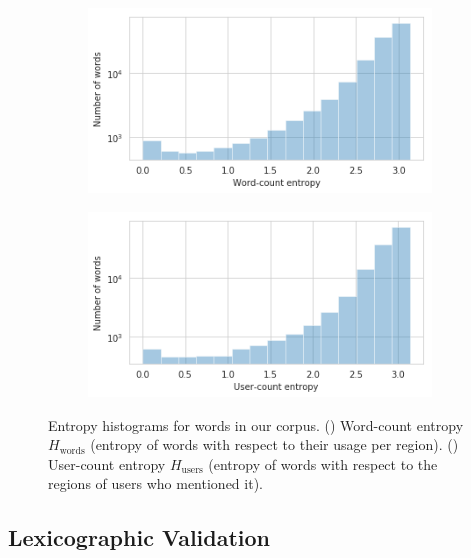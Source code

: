 \begin{figure}[h]
\centering
\begin{subfigure}[t]{0.45\textwidth}
\includegraphics[width=\textwidth]{./images/word_count_entropy.png}
\caption{\label{fig:word_count_entropy}}
\end{subfigure}
\begin{subfigure}[t]{0.45\textwidth}
\includegraphics[width=\textwidth]{./images/user_count_entropy.png}
\caption{\label{fig:user_count_entropy}}
\end{subfigure}

\caption{Entropy histograms for words in our corpus. () Word-count entropy $H_\text{words}$ (entropy of words with respect to their usage per region).
()
User-count entropy $H_\text{users}$ (entropy of words with respect to the regions of users who mentioned it).} 

\label{fig:entropies}

\end{figure}

\subsection{Lexicographic Validation}

